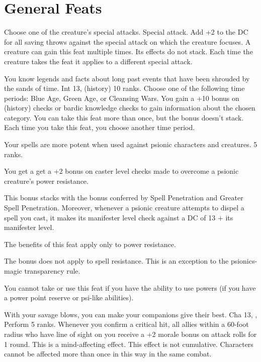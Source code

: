 \section{General Feats}

{Choose one of the creature's special attacks.}
{Special attack.}
{Add +2 to the DC for all saving throws against the special attack on which the creature focuses.}
{}
{A creature can gain this feat multiple times. Its effects do not stack. Each time the creature takes the feat it applies to a different special attack.}

{You know legends and facts about long past events that have been shrouded by the sands of time.}
{Int 13,  (history) 10 ranks.}
{Choose one of the following time periods: Blue Age, Green Age, or Cleansing Wars. You gain a +10 bonus on  (history) checks or bardic knowledge checks to gain information about the chosen category.}{}
{You can take this feat more than once, but the bonus doesn't stack. Each time you take this feat, you choose another time period.}

{Your spells are more potent when used against psionic characters and creatures.}
{ 5 ranks.}
{You get a get a +2 bonus on caster level checks made to overcome a psionic creature's power resistance.

This bonus stacks with the bonus conferred by Spell Penetration and Greater Spell Penetration. Moreover, whenever a psionic creature attempts to dispel a spell you cast, it makes its manifester level check against a DC of 13 + its manifester level.

The benefits of this feat apply only to power resistance.

The bonus does not apply to spell resistance. This is an exception to the psionics-magic transparency rule.}{}
{You cannot take or use this feat if you have the ability to use powers (if you have a power point reserve or psi-like abilities).}

{With your savage blows, you can make your companions give their best.}
{Cha 13, , Perform 5 ranks.}
{Whenever you confirm a critical hit, all allies within a 60-foot radius who have line of sight on you receive a +2 morale bonus on attack rolls for 1 round. This is a mind-affecting effect. This effect is not cumulative. Characters cannot be affected more than once in this way in the same combat.}{}{}

